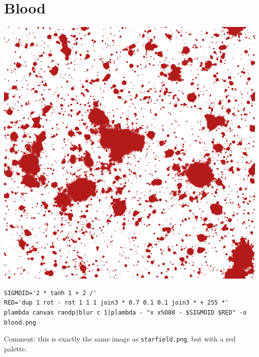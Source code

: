 \section{Blood}
\includegraphics{blood.png}
\begin{verbatim}
SIGMOID='2 * tanh 1 + 2 /'
RED='dup 1 rot - rot 1 1 1 join3 * 0.7 0.1 0.1 join3 * + 255 *'
plambda canvas randp|blur c 1|plambda - "x x%O80 - $SIGMOID $RED" -o blood.png
\end{verbatim}
Comment: this is exactly the same image as \verb+starfield.png+, but with a
red palette.

